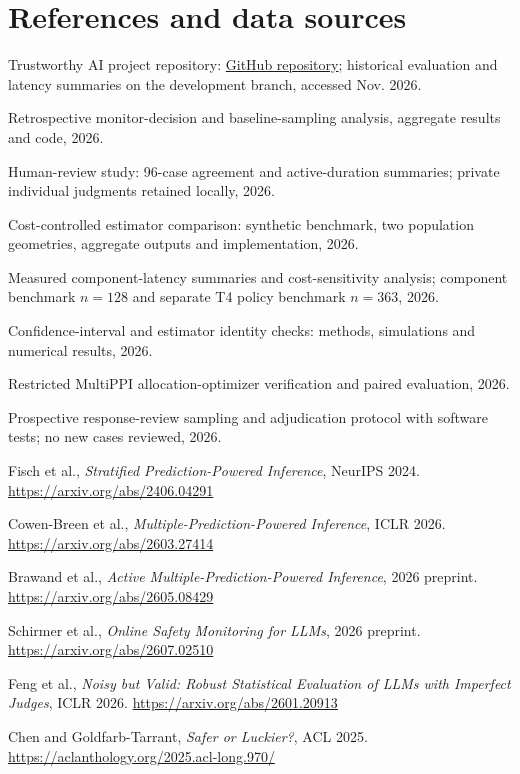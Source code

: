 \documentclass[11pt,a4paper]{article}
\begin{document}
\section*{References and data sources}
\footnotesize
\begin{description}[leftmargin=7mm,labelwidth=6mm,labelsep=0mm,itemsep=0pt,topsep=2pt]
\item[{[D1]}] Trustworthy AI project repository: \href{https://github.com/tivdzualubem/trustworthy-ai-monitor-fusion}{GitHub repository}; historical evaluation and latency summaries on the development branch, accessed Nov. 2026.
\item[{[A1]}] Retrospective monitor-decision and baseline-sampling analysis, aggregate results and code, 2026.
\item[{[A2]}] Human-review study: 96-case agreement and active-duration summaries; private individual judgments retained locally, 2026.
\item[{[A3]}] Cost-controlled estimator comparison: synthetic benchmark, two population geometries, aggregate outputs and implementation, 2026.
\item[{[A4]}] Measured component-latency summaries and cost-sensitivity analysis; component benchmark $n=128$ and separate T4 policy benchmark $n=363$, 2026.
\item[{[A5]}] Confidence-interval and estimator identity checks: methods, simulations and numerical results, 2026.
\item[{[A6]}] Restricted MultiPPI allocation-optimizer verification and paired evaluation, 2026.
\item[{[A7]}] Prospective response-review sampling and adjudication protocol with software tests; no new cases reviewed, 2026.
\item[{[R1]}] Fisch et al., \emph{Stratified Prediction-Powered Inference}, NeurIPS 2024. \url{https://arxiv.org/abs/2406.04291}
\item[{[R2]}] Cowen-Breen et al., \emph{Multiple-Prediction-Powered Inference}, ICLR 2026. \url{https://arxiv.org/abs/2603.27414}
\item[{[R3]}] Brawand et al., \emph{Active Multiple-Prediction-Powered Inference}, 2026 preprint. \url{https://arxiv.org/abs/2605.08429}
\item[{[R4]}] Schirmer et al., \emph{Online Safety Monitoring for LLMs}, 2026 preprint. \url{https://arxiv.org/abs/2607.02510}
\item[{[R5]}] Feng et al., \emph{Noisy but Valid: Robust Statistical Evaluation of LLMs with Imperfect Judges}, ICLR 2026. \url{https://arxiv.org/abs/2601.20913}
\item[{[R6]}] Chen and Goldfarb-Tarrant, \emph{Safer or Luckier?}, ACL 2025. \url{https://aclanthology.org/2025.acl-long.970/}
\end{description}
\end{document}
